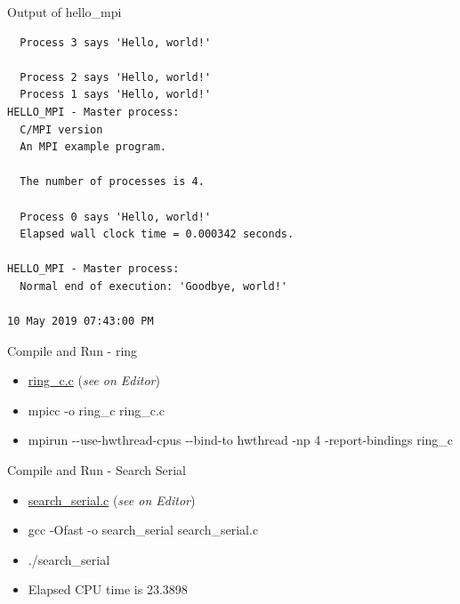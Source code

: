 \documentclass[ignorenonframetext,]{beamer}
\providecommand{\tightlist}{%
  \setlength{\itemsep}{0pt}\setlength{\parskip}{0pt}}
\begin{document}
\begin{frame}[fragile]{Output of hello\_mpi}

\begin{verbatim}
  Process 3 says 'Hello, world!'

  Process 2 says 'Hello, world!'
  Process 1 says 'Hello, world!'
HELLO_MPI - Master process:
  C/MPI version
  An MPI example program.

  The number of processes is 4.

  Process 0 says 'Hello, world!'
  Elapsed wall clock time = 0.000342 seconds.

HELLO_MPI - Master process:
  Normal end of execution: 'Goodbye, world!'

10 May 2019 07:43:00 PM
\end{verbatim}

\end{frame}

\begin{frame}{Compile and Run - ring}

\begin{itemize}
\item
  \url{ring_c.c} (\emph{see on Editor})
\item
  mpicc -o ring\_c ring\_c.c
\item
  mpirun -\/-use-hwthread-cpus -\/-bind-to hwthread -np 4
  -report-bindings ring\_c
\end{itemize}


\end{frame}

\begin{frame}{Compile and Run - Search Serial}

\begin{itemize}
\tightlist
\item
  \url{search_serial.c} (\emph{see on Editor})
\item
  gcc -Ofast -o search\_serial search\_serial.c
\item
  ./search\_serial
\end{itemize}


\begin{itemize}
\tightlist
\item
  Elapsed CPU time is 23.3898
\end{itemize}

\end{frame}
\end{document}
